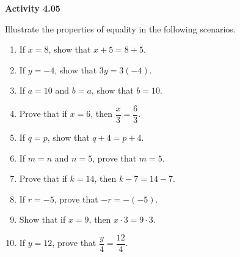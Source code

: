 \vspace{0.3ex}
\noindent\textbf{Activity 4.05}

\vspace{0.2ex}

Illustrate the properties of equality in the following scenarios.

\begin{enumerate}
    \item If \(x = 8\), show that \(x + 5 = 8 + 5\).  
    \item If \(y = -4\), show that \(3y = 3(-4)\).  
    \item If \(a = 10\) and \(b = a\), show that \(b = 10\).  
    \item Prove that if \(x = 6\), then \(\dfrac{x}{3} = \dfrac{6}{3}\).  
    \item If \(q = p\), show that \(q + 4 = p + 4\).  
    \item If \(m = n\) and \(n = 5\), prove that \(m = 5\).  
    \item Prove that if \(k = 14\), then \(k - 7 = 14 - 7\).  
    \item If \(r = -5\), prove that \(-r = -(-5)\).  
    \item Show that if \(x = 9\), then \(x \cdot 3 = 9 \cdot 3\).  
    \item If \(y = 12\), prove that \(\dfrac{y}{4} = \dfrac{12}{4}\).  
\end{enumerate}
